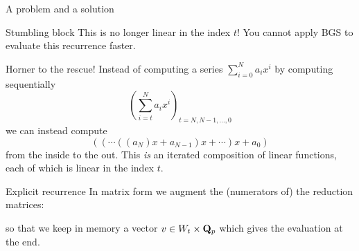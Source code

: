 \begin{frame}{A problem and a solution}

    \begin{alertblock}{Stumbling block}
        This is no longer linear in the index \(t\)!
        You cannot apply BGS to evaluate this recurrence faster.
    \end{alertblock}
    \pause%
    \begin{exampleblock}{Horner to the rescue!}
        Instead of computing a series
        \(\sum_{i = 0}^N a_i x^i\)
        by computing sequentially
        \[{\left(\sum_{i = t}^N a_i x^i\right)}_{t = N,N-1, \ldots, 0}\]
        we can instead compute
        \[((\cdots ((a_N)x + a_{N-1})x  + \cdots)x + a_0)\]
        from the inside to the out.
        This \emph{is} an iterated composition of linear functions, each of which is linear in the index \(t\).
    \end{exampleblock}

\end{frame}

\begin{frame}{Explicit recurrence}
    In matrix form we augment the (numerators of) the reduction matrices:


    so that we keep in memory a vector \(v\in W_{t}\times \mathbf{Q}_p\) which gives the evaluation at the end.

\end{frame}


